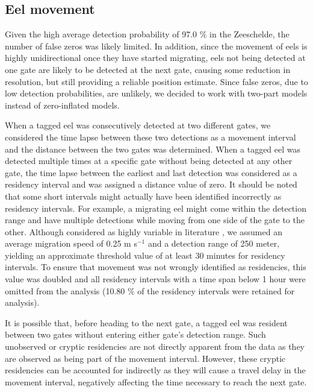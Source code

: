 \documentclass[preprint,12pt,authoryear]{elsarticle}
\begin{document}
\subsection{Eel movement}

Given the high average detection probability of 97.0 \% in the Zeeschelde, the number of false zeros was likely limited. In addition, since the movement of eels is highly unidirectional once they have started migrating, eels not being detected at one gate are likely to be detected at the next gate, causing some reduction in resolution, but still providing a reliable position estimate. Since false zeros, due to low detection probabilities, are unlikely, we decided to work with two-part models instead of zero-inflated models.

When a tagged eel was consecutively detected at two different gates, we considered the time lapse between these two detections as a movement interval and the distance between the two gates was determined. When a tagged eel was detected multiple times at a specific gate without being detected at any other gate, the time lapse between the earliest and last detection was considered as a residency interval and was assigned a distance value of zero. It should be noted that some short intervals might actually have been identified incorrectly as residency intervals. For example, a migrating eel might come within the detection range and have multiple detections while moving from one side of the gate to the other. Although considered as highly variable in literature \citep{Breukelaar2009,Verbiest2012}, we assumed an average migration speed of 0.25 m s$^{-1}$ and a detection range of 250 meter, yielding an approximate threshold value of at least 30 minutes for residency intervals. To ensure that movement was not wrongly identified as residencies, this value was doubled and all residency intervals with a time span below 1 hour were omitted from the analysis (10.80 \% of the residency intervals were retained for analysis). 

It is possible that, before heading to the next gate, a tagged eel was resident between two gates without entering either gate's detection range. Such unobserved or cryptic residencies are not directly apparent from the data as  they are observed as being part of the movement interval. However, these cryptic residencies can be accounted for indirectly as they will cause a travel delay in the movement interval, negatively affecting the time necessary to reach the next gate.
\end{document}
